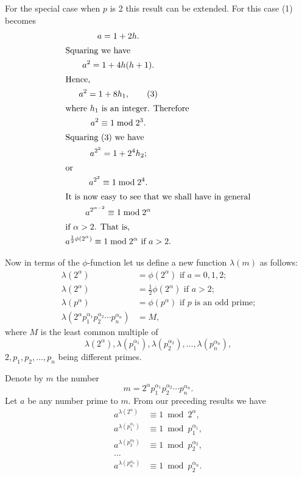 \documentclass[oneside]{book}
\begin{document}
For the special case when $p$ is 2 this result can be extended. For
this case (1) becomes
\begin{gather}
a = 1 + 2h. \notag \\
\intertext{Squaring we have}
a^2 = 1 + 4h(h+1). \notag \\
\intertext{Hence,}
a^2 = 1+8h_1, \tag{3} \\
\intertext{where $h_1$ is an integer. Therefore}
a^2 \equiv 1 \bmod 2^3. \notag \\
\intertext{Squaring (3) we have}
a^{2^2} = 1 + 2^4h_2; \notag \\
\intertext{or}
a^{2^2} \equiv 1 \bmod 2^4. \notag \\
\intertext{It is now easy to see that we shall have in general}
a^{2^{\alpha-2}} \equiv 1 \bmod 2^{\alpha} \notag \\
\intertext{if $\alpha > 2$. That is,}
a^{\frac{1}{2}\phi(2^{\alpha})} \equiv 1 \bmod 2^{\alpha}
  \text{ if } a > 2.
\end{gather}

Now in terms of the $\phi$-function let us define a new function
$\lambda(m)$ as follows:
\begin{align*}
\lambda(2^{\alpha}) &= \phi(2^{\alpha}) \text{ if $a = 0, 1, 2$;} \\
\lambda(2^{\alpha}) &= \frac{1}{2}\phi(2^{\alpha})
                                               \text{ if $a > 2$;} \\
\lambda(p^{\alpha}) &= \phi(p^{\alpha})
                                   \text{ if $p$ is an odd prime;} \\
\lambda(2^{\alpha} p_1^{\alpha_1} p_2^{\alpha_2} \cdots
    p_n^{\alpha_n}) &= M,
\end{align*}
where $M$ is the least common multiple of
\begin{equation*}
  \lambda(2^{\alpha}),
  \lambda(p_1^{\alpha_1}),
  \lambda(p_2^{\alpha_2}), \ldots, \lambda(p_n^{\alpha_n}),
\end{equation*}
$2, p_1, p_2, \ldots, p_n$ being different primes.%

Denote by $m$ the number
\begin{equation*}
m = 2^{\alpha}p_1^{\alpha_1}p_2^{\alpha_2} \cdots p_n^{\alpha_n}.
\end{equation*}
Let $a$ be any number prime to $m$. From our preceding results we
have
\begin{align*}
a^{\lambda(2^{\alpha})}     &\equiv 1 \bmod 2^{\alpha}, \\
a^{\lambda(p_1^{\alpha_1})} &\equiv 1 \bmod p_1^{\alpha_1},\\
a^{\lambda(p_2^{\alpha_2})} &\equiv 1 \bmod p_2^{\alpha_2}, \\
\ldots \\
a^{\lambda(p_n^{\alpha_n})} &\equiv 1 \bmod p_2^{\alpha_n}. \\
\end{align*}
\end{document}
